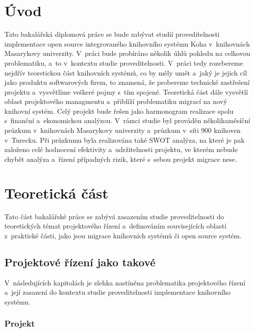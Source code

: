 \documentclass[
	11pt, oneside, printed, final, palatino
	microtype,
	table,   %
	lof,     %
	lot     %
]{fithesis3}
\begin{document}
{%

\chapter*{Úvod}
\indent Tato bakalářská diplomová práce se bude zabývat studií proveditelnosti implementace open source integrovaného knihovního systému Koha v~knihovnách Masarykovy univerzity. V~práci bude probíráno několik úhlů pohledu na celkovou problematiku, a~to v~kontextu studie proveditelnosti. V~práci tedy rozebereme nejdřív teoretickou část knihovních systémů, co by měly umět a~jaký je jejich cíl jako produktu softwarových firem, to znamená, že probereme technické zastřešení projektu a~vysvětlíme veškeré pojmy s~tím spojené. Teoretická část dále vysvětlí oblast projektového managmentu a~přiblíží problematiku migrací na nový knihovní systém. Celý projekt bude řešen jako harmonogram realizace spolu s~finanční a~ekonomickou analýzou. V~rámci studie byl prováděn několikaměsíční průzkum v~knihovnách Masarykovy univerzity a~průzkum v~síti 900 knihoven v~Turecku. Při průzkumu byla realizována také SWOT analýza, na které je pak založeno celé hodnocení efektivity a~udržitelnosti projektu, ve kterém nebude chybět analýza a~řízení případných rizik, které s~sebou projekt migrace nese.

\chapter{Teoretická část}

\indent Tato část bakalářské práce se zabývá zasazením studie proveditelnosti do teoretických témat projektového řízení a~definováním souvisejících oblastí z~praktické části, jako jsou migrace knihovních systémů či open source systém.

\section{Projektové řízení jako takové} \label{sec:projektove_rizeni_jako_takove}

\indent V~následujících kapitolách je zlehka nastíněna problematika projektového řízení a~její zasazení do kontextu studie proveditelnosti implementace knihovního systému.


\subsection{Projekt}

}
\end{document}
